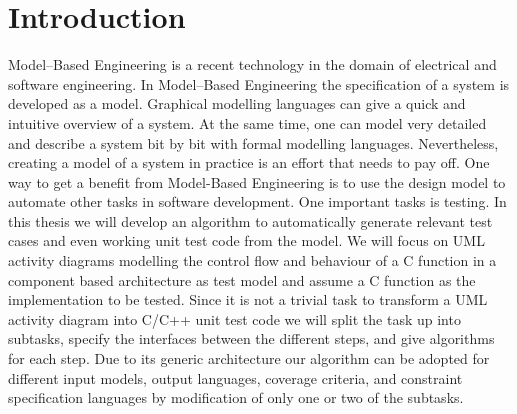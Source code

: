 \chapter{Introduction}
Model--Based Engineering is a recent technology in the domain of electrical and software engineering. In Model--Based Engineering the specification of a system is developed as a model.
Graphical modelling languages can give a quick and intuitive overview of a system. At the same time, one can model very detailed and describe a system bit by bit with formal modelling languages.
Nevertheless, creating a model of a system in practice is an effort that needs to pay off.
One way to get a benefit from Model-Based Engineering is to use the design model to automate other tasks in software development. One important tasks is testing. 
In this thesis we will develop an algorithm to automatically generate relevant test cases and even working unit test code from the model. We will focus on UML activity diagrams modelling the control flow and behaviour of a C function in a component based architecture as test model and assume a C function as the implementation to be tested. Since it is not a trivial task to transform a UML activity diagram into C/C++ unit test code we will split the task up into subtasks, specify the interfaces between the different steps, and give algorithms for each step. Due to its generic architecture our algorithm can be adopted for different input models, output languages, coverage criteria, and constraint specification languages by modification of only one or two of the subtasks.
